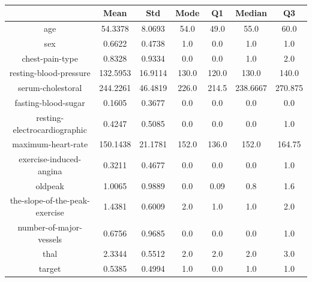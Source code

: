 \documentclass{classrep}
\begin{document}
{{{                \begin{table}[!htbp]
                    \centering
                    \begin{tabular}{|c|c|c|c|c|c|c|}
                        \hline
                        & Mean & Std & Mode & Q1 & Median & Q3 \\ \hline
                        age & 54.3378 & 8.0693 & 54.0 & 49.0 & 55.0 & 60.0 \\ \hline
                        sex & 0.6622 & 0.4738 & 1.0 & 0.0 & 1.0 & 1.0 \\ \hline
                        chest-pain-type & 0.8328 & 0.9334 & 0.0 & 0.0 & 1.0 & 2.0 \\ \hline
                        resting-blood-pressure & 132.5953 & 16.9114 & 130.0 & 120.0 & 130.0 & 140.0 \\ \hline
                        serum-cholestoral & 244.2261 & 46.4819 & 226.0 & 214.5 & 238.6667 & 270.875 \\ \hline
                        fasting-blood-sugar & 0.1605 & 0.3677 & 0.0 & 0.0 & 0.0 & 0.0 \\ \hline
                        resting-electrocardiographic & 0.4247 & 0.5085 & 0.0 & 0.0 & 0.0 & 1.0 \\ \hline
                        maximum-heart-rate & 150.1438 & 21.1781 & 152.0 & 136.0 & 152.0 & 164.75 \\ \hline
                        exercise-induced-angina & 0.3211 & 0.4677 & 0.0 & 0.0 & 0.0 & 1.0 \\ \hline
                        oldpeak & 1.0065 & 0.9889 & 0.0 & 0.09 & 0.8 & 1.6 \\ \hline
                        the-slope-of-the-peak-exercise & 1.4381 & 0.6009 & 2.0 & 1.0 & 1.0 & 2.0 \\ \hline
                        number-of-major-vessels & 0.6756 & 0.9685 & 0.0 & 0.0 & 0.0 & 1.0 \\ \hline
                        thal & 2.3344 & 0.5512 & 2.0 & 2.0 & 2.0 & 3.0 \\ \hline
                        target & 0.5385 & 0.4994 & 1.0 & 0.0 & 1.0 & 1.0 \\ \hline
                    \end{tabular}
                    \caption{}
                    \label{result_45_Interpolation}
                \end{table}
                \FloatBarrier

}}}
\end{document}
